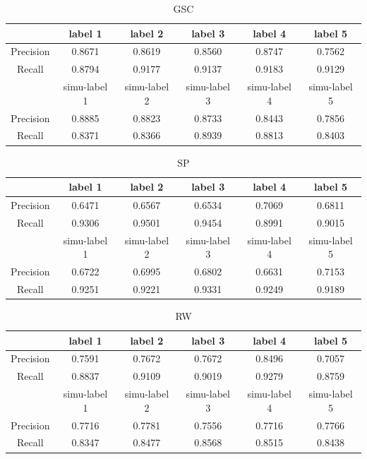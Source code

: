 \documentclass[runningheads,a4paper]{llncs}
\begin{document}
\begin{table}
\centering
\begin{tabular}{|c|c|c|c|c|c|}
\hline
 & label 1 & label 2&label 3&label 4&label 5 \\
  \hline
Precision& 0.8671 & 0.8619 & 0.8560& 0.8747& 0.7562 \\
\hline
Recall& 0.8794 & 0.9177 & 0.9137& 0.9183& 0.9129  \\
\hline
 & simu-label 1 & simu-label 2&simu-label 3&simu-label 4&simu-label 5 \\
\hline
Precision& 0.8885 & 0.8823 & 0.8733& 0.8443& 0.7856 \\
\hline
Recall& 0.8371 & 0.8366 & 0.8939& 0.8813& 0.8403 \\
\hline
\end{tabular}
\caption{GSC}
\label{ta: simu in gsc}
\end{table}

\begin{table}
\centering
\begin{tabular}{|c|c|c|c|c|c|}
\hline
 & label 1 & label 2&label 3&label 4&label 5 \\
\hline
Precision& 0.6471 & 0.6567 & 0.6534& 0.7069& 0.6811 \\
\hline
Recall& 0.9306 & 0.9501 & 0.9454& 0.8991& 0.9015 \\
\hline
 & simu-label 1 & simu-label 2&simu-label 3&simu-label 4&simu-label 5 \\
\hline
Precision& 0.6722 & 0.6995 & 0.6802& 0.6631& 0.7153 \\
\hline
Recall& 0.9251 & 0.9221 & 0.9331& 0.9249& 0.9189 \\
\hline
\end{tabular}
\caption{SP}
\label{ta: simu in sp}
\end{table}


\begin{table}
\centering
\begin{tabular}{|c|c|c|c|c|c|}
\hline
 & label 1 & label 2&label 3&label 4&label 5 \\
\hline
Precision& 0.7591 & 0.7672 & 0.7672& 0.8496& 0.7057 \\
\hline
Recall& 0.8837 & 0.9109 & 0.9019& 0.9279& 0.8759 \\
\hline
 & simu-label 1 & simu-label 2&simu-label 3&simu-label 4&simu-label 5 \\
\hline
Precision& 0.7716 & 0.7781 & 0.7556& 0.7716& 0.7766 \\
\hline
Recall& 0.8347 & 0.8477 & 0.8568& 0.8515& 0.8438 \\
\hline
\end{tabular}
\caption{RW}
\label{ta: simu in rw}
\end{table}
\end{document}

